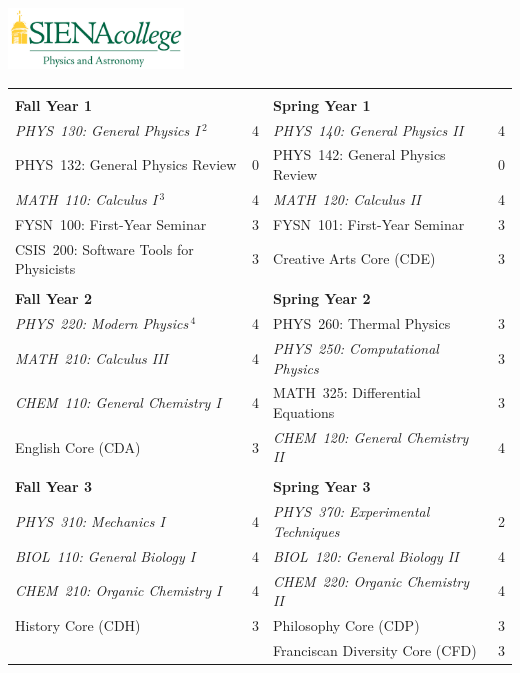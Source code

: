 \documentclass[12pt]{article}
\begin{document}
\hfill \includegraphics[width=0.35\textwidth]{siena_phys_astro_print_crop.jpg}

\vspace{0.1cm}
\vspace{0.3cm}

\vspace*{-5mm}
\begin{table}[h!]
\begin{center}
{\renewcommand{\arraystretch}{1.2}
\begin{tabular*}{0.9\textwidth}{@{\extracolsep{\fill}}lclc}
 & \\
{\Large \textbf{Fall Year 1}} & & {\Large \textbf{Spring Year 1}} & \\
\hline
{\em PHYS~130: General Physics I}\,$^{2}$  & 4 & {\em PHYS~140: General Physics II}     & 4 \\
PHYS~132: General Physics Review         & 0 & PHYS~142: General Physics Review & 0\\
{\em MATH~110: Calculus I}\,$^{3}$         & 4 & {\em MATH~120: Calculus II}            & 4 \\
FYSN~100: First-Year Seminar            & 3 & FYSN~101: First-Year Seminar     & 3\\
CSIS~200: Software Tools for Physicists & 3 & Creative Arts Core (CDE)         & 3 \\

 & \\
{\Large \textbf{Fall Year 2}} & & {\Large \textbf{Spring Year 2}} & \\
\hline
{\em PHYS~220: Modern Physics}\,$^{4}$      & 4 & PHYS~260: Thermal Physics        & 3 \\
{\em MATH~210: Calculus III}               & 4 & {\em PHYS~250: Computational Physics} & 3  \\
{\em CHEM~110: General Chemistry I}        & 4 & MATH~325: Differential Equations & 3 \\
English Core (CDA)                        & 3 & {\em CHEM~120: General Chemistry II} & 4 \\

 & \\
{\Large \textbf{Fall Year 3}} & & {\Large \textbf{Spring Year 3}} & \\
\hline
{\em PHYS~310: Mechanics I}         & 4 & {\em PHYS~370: Experimental Techniques} & 2 \\
{\em BIOL~110: General Biology I} & 4 & {\em BIOL~120: General Biology II} & 4 \\
{\em CHEM~210: Organic Chemistry I} & 4 & {\em CHEM~220: Organic Chemistry II} & 4 \\
History Core (CDH)                  & 3 & Philosophy Core (CDP)             & 3 \\
                                           &   & Franciscan Diversity Core (CFD) & 3 \\


\end{tabular*}}
\end{center}
\end{table}
\end{document}
